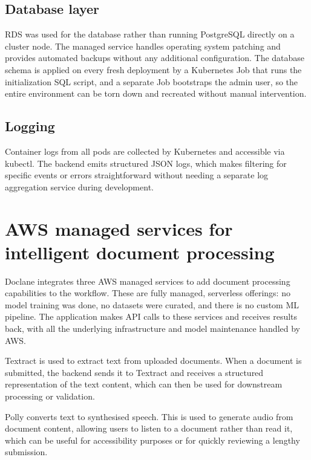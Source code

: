 \subsection{Database layer}

\par RDS was used for the database rather than running PostgreSQL directly on a cluster node. The managed service handles operating system patching and provides automated backups without any additional configuration. The database schema is applied on every fresh deployment by a Kubernetes Job that runs the initialization SQL script, and a separate Job bootstraps the admin user, so the entire environment can be torn down and recreated without manual intervention.

\subsection{Logging}

\par Container logs from all pods are collected by Kubernetes and accessible via kubectl. The backend emits structured JSON logs, which makes filtering for specific events or errors straightforward without needing a separate log aggregation service during development.

\section{AWS managed services for intelligent document processing}

\par Doclane integrates three AWS managed services to add document processing capabilities to the workflow. These are fully managed, serverless offerings: no model training was done, no datasets were curated, and there is no custom ML pipeline. The application makes API calls to these services and receives results back, with all the underlying infrastructure and model maintenance handled by AWS.

\par Textract is used to extract text from uploaded documents. When a document is submitted, the backend sends it to Textract and receives a structured representation of the text content, which can then be used for downstream processing or validation.

\par Polly converts text to synthesised speech. This is used to generate audio from document content, allowing users to listen to a document rather than read it, which can be useful for accessibility purposes or for quickly reviewing a lengthy submission.

